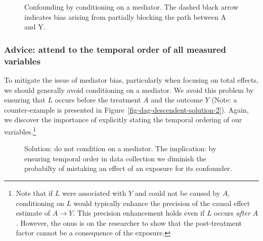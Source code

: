 \documentclass[
  singlecolumn]{article}
\begin{document}
\begin{figure}


\caption{\label{fig-dag-mediator}Confounding by conditioning on a
mediator. The dashed black arrow indicates bias arising from partially
blocking the path between A and Y.}

\end{figure}%

\subsubsection{Advice: attend to the temporal order of all measured
variables}\label{advice-attend-to-the-temporal-order-of-all-measured-variables-2}

To mitigate the issue of mediator bias, particularly when focusing on
total effects, we should generally avoid conditioning on a mediator. We
avoid this problem by ensuring that \(L\) occurs before the treatment
\(A\) and the outcome \(Y\) (Note: a counter-example is presented in
Figure~\ref{fig-dag-descendent-solution-2}). Again, we discover the
importance of explicitly stating the temporal ordering of our
variables.\footnote{Note that if \(L\) were associated with \(Y\) and
  could not be caused by \(A\), conditioning on \(L\) would typically
  enhance the precision of the causal effect estimate of \(A \to Y\).
  This precision enhancement holds even if \(L\) occurs \emph{after}
  \(A\). However, the onus is on the researcher to show that the
  post-treatment factor cannot be a consequence of the exposure.}

\begin{figure}


\caption{\label{fig-dag-mediator-solution}Solution: do not condition on
a mediator. The implication: by ensuring temporal order in data
collection we diminish the probabilty of mistaking an effect of an
exposure for its confounder.}

\end{figure}%
\end{document}

